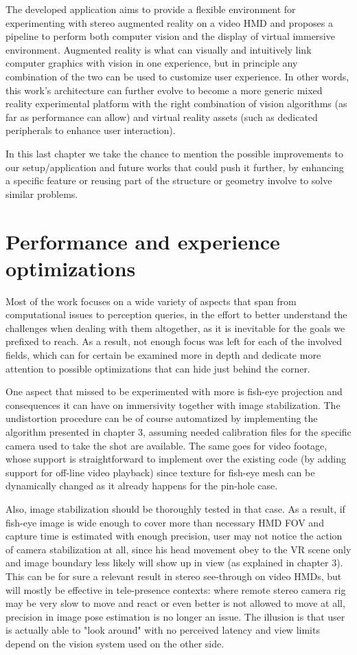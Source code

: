 
The developed application aims to provide a flexible environment for experimenting with stereo augmented reality on a video HMD and proposes a pipeline to perform both computer vision and the display of virtual immersive environment. Augmented reality is what can visually and intuitively link computer graphics with vision in one experience, but in principle any combination of the two can be used to customize user experience. In other words, this work's architecture can further evolve to become a more generic mixed reality experimental platform with the right combination of vision algorithms (as far as performance can allow) and virtual reality assets (such as dedicated peripherals to enhance user interaction).

In this last chapter we take the chance to mention the possible improvements to our setup/application and future works that could push it further, by enhancing a specific feature or reusing part of the structure or geometry involve to solve similar problems.

\section{Performance and experience optimizations}
Most of the work focuses on a wide variety of aspects that span from computational issues to perception queries, in the effort to better understand the challenges when dealing with them altogether, as it is inevitable for the goals we prefixed to reach. As a result, not enough focus was left for each of the involved fields, which can for certain be examined more in depth and dedicate more attention to possible optimizations that can hide just behind the corner.

One aspect that missed to be experimented with more is fish-eye projection and consequences it can have on immersivity together with image stabilization. The undistortion procedure can be of course automatized by implementing the algorithm presented in chapter 3, assuming needed calibration files for the specific camera used to take the shot are available. The same goes for video footage, whose support is straightforward to implement over the existing code (by adding support for off-line video playback) since texture for fish-eye mesh can be dynamically changed as it already happens for the pin-hole case.

Also, image stabilization should be thoroughly tested in that case. As a result, if fish-eye image is wide enough to cover more than necessary HMD FOV and capture time is estimated with enough precision, user may not notice the action of camera stabilization at all, since his head movement obey to the VR scene only and image boundary less likely will show up in view (as explained in chapter 3). This can be for sure a relevant result in stereo see-through on video HMDs, but will mostly be effective in tele-presence contexts: where remote stereo camera rig may be very slow to move and react or even better is not allowed to move at all, precision in image pose estimation is no longer an issue. The illusion is that user is actually able to "look around" with no perceived latency and view limits depend on the vision system used on the other side.


